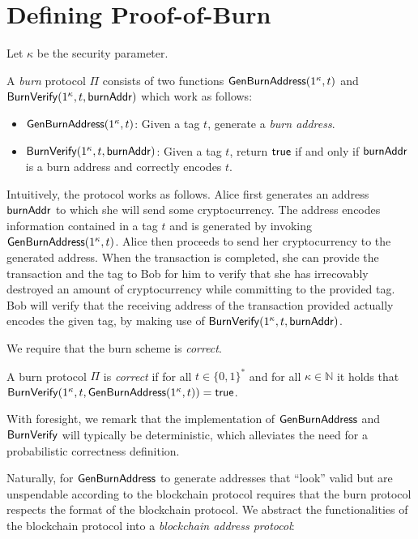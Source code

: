 \section{Defining Proof-of-Burn}

Let $\kappa$ be the security parameter.

\begin{definition}
  A \emph{burn} protocol $\Pi$ consists of two functions $\mathsf{Gen}\-\mathsf{Burn}\-\mathsf{Address}(1^\kappa, t)$ and $\mathsf{BurnVerify}(1^\kappa, t, \mathsf{burnAddr})$ which work as follows:

  \begin{itemize}
    \item $\mathsf{Gen}\-\mathsf{Burn}\-\mathsf{Address}(1^\kappa, t)$: Given a tag $t$, generate a \emph{burn address}.

    \item $\mathsf{BurnVerify}(1^\kappa, t, \mathsf{burnAddr})$: Given a tag $t$, return $\sf{true}$ if and only if $\mathsf{burnAddr}$ is a burn address and correctly encodes $t$.
  \end{itemize}
\end{definition}

Intuitively, the protocol works as follows. Alice first generates an address $\mathsf{burnAddr}$ to which she will send some cryptocurrency. The address encodes information contained in a tag $t$ and is generated by invoking $\mathsf{Gen}\-\mathsf{Burn}\-\mathsf{Address}(1^\kappa, t)$. Alice then proceeds to send her cryptocurrency to the generated address. When the transaction is completed, she can provide the transaction and the tag to Bob for him to verify that she has irrecovably destroyed an amount of cryptocurrency while committing to the provided tag. Bob will verify that the receiving address of the transaction provided actually encodes the given tag, by making use of $\mathsf{BurnVerify}(1^\kappa, t, \mathsf{burnAddr})$.

We require that the burn scheme is \emph{correct}.

\begin{definition}[Correctness]
  A burn protocol $\Pi$ is \emph{correct} if for all $t \in \{0,1\}^*$ and for all $\kappa \in \mathbb{N}$ it holds that
  $\mathsf{BurnVerify}(1^\kappa, t, \mathsf{Gen}\-\mathsf{Burn}\-\mathsf{Address}(1^\kappa, t)) = \mathsf{true}$.
\end{definition}

With foresight, we remark that the implementation of $\mathsf{Gen}\-\mathsf{Burn}\-\mathsf{Address}$ and $\mathsf{BurnVerify}$ will typically be deterministic, which alleviates the need for a probabilistic correctness definition.

Naturally, for $\mathsf{Gen}\-\mathsf{Burn}\-\mathsf{Address}$ to generate addresses that ``look'' valid but are unspendable according to the blockchain protocol requires that the burn protocol respects the format of the blockchain protocol. We abstract the functionalities of the blockchain protocol into a \emph{blockchain address protocol}:

